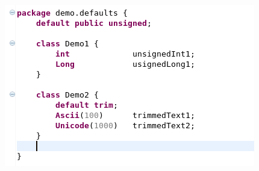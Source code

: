 \documentclass[11pt,a4paper,oneside]{article}
\begin{document}
\vspace{2mm}

\hspace{1cm}\includegraphics[scale=0.5]{images/tut1-009-defaults.png}
 
\end{document}
